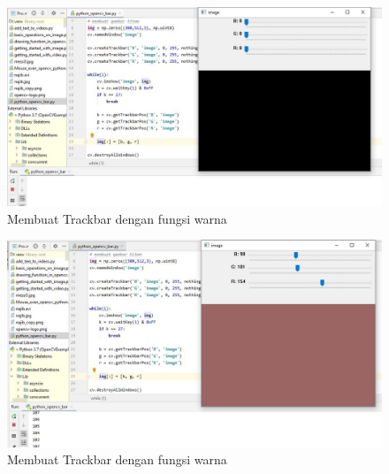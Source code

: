 \begin{figure}[ht]
\centering
\includegraphics[scale=0.42]{figures/2,31.jpg}
\caption{Membuat Trackbar dengan fungsi warna}
\label{contoh}
\end{figure}

\newpage
\begin{figure}[ht]
\centering
\includegraphics[scale=0.42]{figures/2,31,1.jpg}
\caption{Membuat Trackbar dengan fungsi warna}
\label{contoh}
\end{figure}



\newpage
